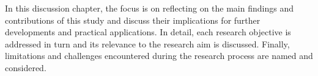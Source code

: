 In this discussion chapter, the focus is on reflecting on the main findings and contributions of this study and discuss their implications for further developments and practical applications. In detail, each research objective is addressed in turn and its relevance to the research aim is discussed. Finally, limitations and challenges encountered during the research process are named and considered. 









